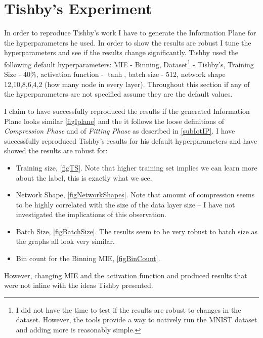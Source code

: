 \documentclass[dissertation.tex]{subfiles}
\begin{document}
\section{Tishby's Experiment}

In order to reproduce Tishby's work I have to generate the Information Plane for
the hyperparameters he used. In order to show the results are robust I tune the
hyperparameters and see if the results change significantly. Tishby used the
following default hyperparameters: MIE - Binning, Dataset\footnote{I did not
have the time to test if the results are robust to changes in the dataset.
However, the tools provide a way to natively run the MNIST dataset and adding
more is reasonably simple.} - Tishby's, Training Size - 40\%, activation
function - $\tanh$, batch size - 512, network shape 12,10,8,6,4,2 (how many node
in every layer). Throughout this section if any of the hyperparameters are not
specified assume they are the default values. 

I claim to have successfully reproduced the results if the generated Information
Plane looks similar \autoref{figIplane} and the it follows the loose definitions
of \emph{Compression Phase} and of \emph{Fitting Phase} as described in
\autoref{subIotIP}. I have successfully reproduced Tishby's results for his
default hyperparameters and have showed the results are robust for:
\begin{itemize}
  \item{
      Training size, \autoref{figTS}. Note that higher training set implies we
      can learn more about the label, this is exactly what we see.
    }
  \item{
      Network Shape, \autoref{figNetworkShapes}. Note that amount of compression
      seems to be highly correlated with the size of the data layer size -- I
      have not investigated the implications of this observation.
    }
  \item{
      Batch Size, \autoref{figBatchSize}. The results seem to be very robust to
      batch size as the graphs all look very similar.
    }
  \item{
      Bin count for the Binning MIE, \autoref{figBinCount}.
    }
\end{itemize}

However, changing MIE and the activation function and produced results that were
not inline with the ideas Tishby presented.
\end{document}
